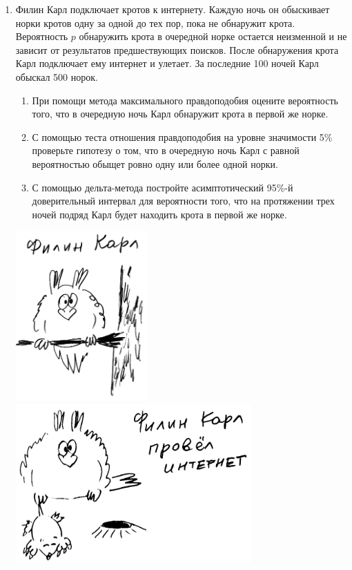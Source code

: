 \begin{enumerate}
\item Филин Карл подключает кротов к интернету. Каждую ночь он обыскивает норки кротов одну за одной до тех пор, 
пока не обнаружит крота. Вероятность $p$ обнаружить крота в очередной норке остается неизменной и не зависит от результатов предшествующих поисков. 
После обнаружения крота Карл подключает ему интернет и улетает. За последние 100 ночей Карл обыскал 500 норок.

\begin{enumerate}
	\item При помощи метода максимального правдоподобия оцените вероятность того, 
	что в очередную ночь Карл обнаружит крота в первой же норке.
	\item С помощью теста отношения правдоподобия на уровне значимости 5\% проверьте гипотезу о том, 
	что в очередную ночь Карл с равной вероятностью обыщет ровно одну или более одной норки.
	\item С помощью дельта-метода постройте асимптотический 95\%-й доверительный интервал для вероятности того, 
	что на протяжении трех ночей подряд Карл будет находить крота в первой же норке.
\end{enumerate}


\includegraphics[width=5cm]{images/filin_karl_01.png}
\hspace*{3cm}
\includegraphics[width=9cm]{images/filin_karl_02.png}


\end{enumerate}
